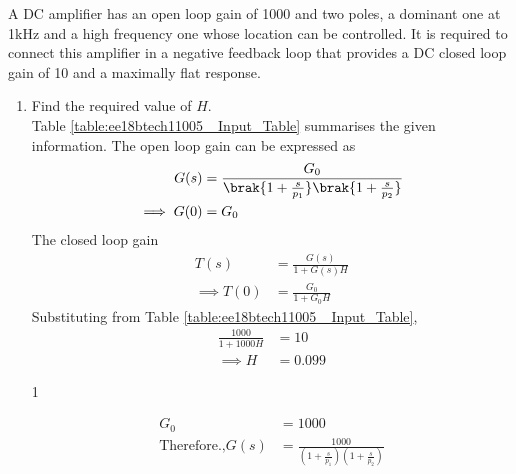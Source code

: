 
A DC amplifier has an open loop gain of 1000 and two poles, a dominant one at 1kHz and a high frequency one whose location can be controlled. It is required to connect this amplifier in a negative feedback loop that provides a DC closed loop gain of 10 and a maximally flat response. 

\begin{enumerate}[label=\arabic*.,ref=\theenumi]

\item Find the required value of $H$.
\\
\solution Table \ref{table:ee18btech11005_ Input_Table} summarises the given information.  The open loop gain can be expressed as
\begin{align}
\label{eq:ee18btech11005_open_loop_gain} 
  G(s) &= \frac{G_0}{\brak{1+\frac{s}{p_{1}}}\brak{1+\frac{s}{p_{2}}}} 
\\
\implies G(0) &= G_0
\end{align}
The closed loop gain 
\begin{align}
 \label{eq:ee18btech11005_transfer_function}
    T(s) &= \frac{G(s)}{1+G(s)H}
\\
\implies T(0) &= \frac{G_0}{1+G_0H}
\end{align}
%
Substituting from Table \ref{table:ee18btech11005_ Input_Table}, 
\begin{align}
\frac{1000}{1+1000H} &= 10
\\
\implies H &=  0.099 
\label{eq:ee18btech11005_h_value}
\end{align}
%
\begin{table}[!ht]
\centering

\caption{1}
\label{table:ee18btech11005_ Input_Table}
\end{table}
\begin{align}
    G_0 &= 1000\\
\text{Therefore.,} G(s)&= \frac{1000}{(1+\frac{s}{p_{1}})(1+\frac{s}{p_{2}})}  
\end{align}

\end{enumerate}
